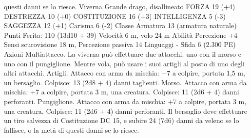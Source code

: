 \begin{multicols}{2}
questi danni se lo riesce.
Viverna
Grande drago, disallineato
FORZA 19 (+4)
DESTREZZA 10 (+0)
COSTITUZIONE 16 (+3)
INTELLIGENZA 5 (-3)
SAGGEZZA 12 (+1)
Carisma 6 (-2)
Classe Armatura 13 (armatura naturale)
\hspace*{0pt}\hfill{Punti Ferita}: 110 (13d10 + 39)
Velocità 6 m, volo 24 m
Abilità Percezione +4
Sensi scurovisione 18 m, Percezione passiva 14
Linguaggi -
Sfida 6 (2.300 PE)
Azioni
Multiattacco. La viverna può effettuare due attacchi: uno con il
morso e uno con il pungiglione. Mentre vola, può usare i suoi
artigli al posto di uno degli altri attacchi.
Artigli. Attacco con arma da mischia: +7 a colpire, portata 1,5
m, un bersaglio.
Colpisce: 13 (2d8 + 4) danni taglienti.
Morso. Attacco con arma da mischia: +7 a colpire, portata 3 m,
una creatura.
Colpisce: 11 (2d6 + 4) danni perforanti.
Pungiglione. Attacco con arma da mischia: +7 a colpire, portata
3 m, una creatura.
Colpisce: 11 (2d6 + 4) danni perforanti. Il bersaglio deve
effettuare un tiro salvezza di Costituzione DC 15, e subire 24
(7d6) danni da veleno se lo fallisce, o la metà di questi danni se
lo riesce.
 

\end{multicols}
